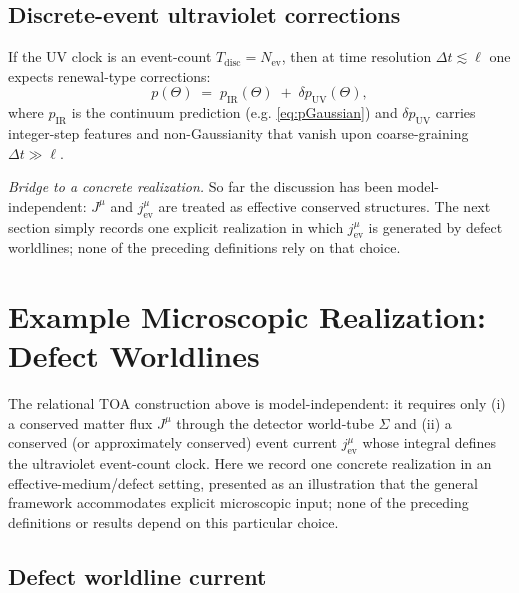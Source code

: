 \documentclass[11pt, a4paper]{article}
\theoremstyle{definition}
\theoremstyle{plain}
\theoremstyle{remark}
\numberwithin{equation}{section}
\newcommand{\Nev}{N_{\mathrm{ev}}}
\begin{document}
    \subsection{Discrete-event ultraviolet corrections}
    
    If the UV clock is an event-count $T_{\mathrm{disc}}=\Nev$, then at time resolution $\Delta t \lesssim \ell$ one expects renewal-type corrections:
    \begin{equation}
        p(\Theta)\;=\;p_{\mathrm{IR}}(\Theta)\;+\;\delta p_{\mathrm{UV}}(\Theta),
    \end{equation}
    where $p_{\mathrm{IR}}$ is the continuum prediction (e.g. \eqref{eq:pGaussian}) and $\delta p_{\mathrm{UV}}$ carries integer-step features and non-Gaussianity that vanish upon coarse-graining $\Delta t\gg \ell$.
    
    \medskip
    \noindent
    \textit{Bridge to a concrete realization.}
    So far the discussion has been model-independent: $J^\mu$ and $j^\mu_{\mathrm{ev}}$ are treated as effective conserved structures. The next section simply records one explicit realization in which $j^\mu_{\mathrm{ev}}$ is generated by defect worldlines; none of the preceding definitions rely on that choice.

    \section{Example Microscopic Realization: Defect Worldlines}
    \label{sec:defectrealization}
    
    The relational TOA construction above is model-independent: it requires only (i) a conserved matter flux $J^\mu$ through the detector world-tube $\Sigma$ and (ii) a conserved (or approximately conserved) event current $j^\mu_{\mathrm{ev}}$ whose integral defines the ultraviolet event-count clock. Here we record one concrete realization in an effective-medium/defect setting, presented as an illustration that the general framework accommodates explicit microscopic input; none of the preceding definitions or results depend on this particular choice.
    
    \subsection{Defect worldline current}
        
\end{document}
